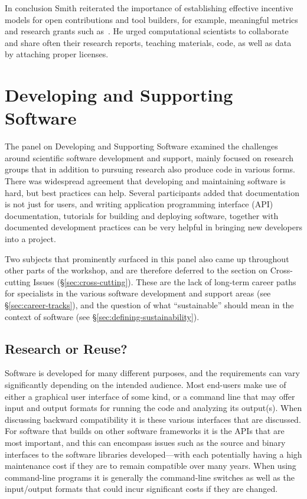 \documentclass[11pt, oneside]{amsart}
\newcommand{\note}[1]{ {\textcolor{red}    { #1 }}}
\begin{document}
In conclusion Smith reiterated the importance of establishing effective
incentive models for open contributions and tool builders, for
example, meaningful metrics and research grants such as~\cite{NSF_software_vision}. He urged computational scientists to
collaborate and share often their research reports, teaching
materials, code, as well as data by attaching proper licenses.

\section{Developing and Supporting Software} \label{sec:devel}%

The panel on Developing and Supporting Software examined the challenges
around scientific software development and support, mainly focused on research
groups that in addition to pursuing research also produce code in various forms. There was widespread agreement
that developing and maintaining software is hard, but best practices can help.
Several participants added that documentation is not just for users, and writing
application programming interface (API) documentation, tutorials for building and deploying software, together with
documented development practices can be very helpful in bringing  new developers
into a project.

Two subjects that prominently surfaced in this panel also came up
throughout other parts of the workshop, and are therefore deferred to
the section on Cross-cutting Issues (\S\ref{sec:cross-cutting}). These
are the lack of long-term career paths for specialists in the various
software development and support areas (see
\S\ref{sec:career-tracks}), and the question of what ``sustainable''
should mean in the context of software (see
\S\ref{sec:defining-sustainability}).

\subsection{Research or Reuse?}

Software is developed for many different purposes, and the requirements can
vary significantly depending on the intended audience. Most end-users make use
of either a graphical user interface of some kind, or a command line that may
offer input and output formats for running the code and analyzing its output(s).
When discussing backward compatibility it is these various interfaces that are
discussed. For software that builds on other software frameworks it is the
APIs that are most important, and this can
encompass issues such as the source and binary interfaces to the software
libraries developed---with each potentially having a high maintenance cost if
they are to remain compatible over many years. When using command-line programs
it is generally the command-line switches as well as the input/output formats
that could incur significant costs if they are changed.
\end{document}
